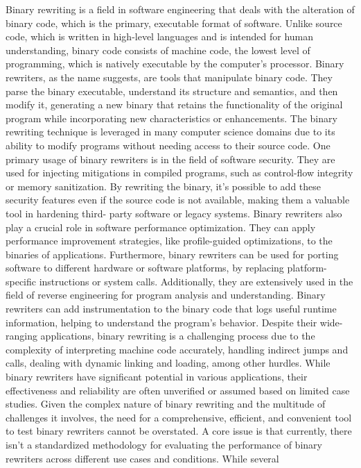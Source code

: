\documentclass[a4paper,11pt,oneside]{report}
\begin{document}
Binary rewriting is a field in software engineering that deals with the alteration of
binary code, which is the primary, executable format of software. Unlike source code, which
is written in high-level languages and is intended for human understanding, binary code
consists of machine code, the lowest level of programming, which is natively executable by
the computer's processor.
Binary rewriters, as the name suggests, are tools that manipulate binary code. They
parse the binary executable, understand its structure and semantics, and then modify it,
generating a new binary that retains the functionality of the original program while
incorporating new characteristics or enhancements. The binary rewriting technique is
leveraged in many computer science domains due to its ability to modify programs without
needing access to their source code.
One primary usage of binary rewriters is in the field of software security. They are
used for injecting mitigations in compiled programs, such as control-flow integrity or
memory sanitization. By rewriting the binary, it's possible to add these security features
even if the source code is not available, making them a valuable tool in hardening third-
party software or legacy systems. Binary rewriters also play a crucial role in software
performance optimization. They can apply performance improvement strategies, like
profile-guided optimizations, to the binaries of applications. Furthermore, binary rewriters
can be used for porting software to different hardware or software platforms, by replacing
platform-specific instructions or system calls. Additionally, they are extensively used in the
field of reverse engineering for program analysis and understanding. Binary rewriters can
add instrumentation to the binary code that logs useful runtime information, helping to
understand the program's behavior.
Despite their wide-ranging applications, binary rewriting is a challenging process due
to the complexity of interpreting machine code accurately, handling indirect jumps and
calls, dealing with dynamic linking and loading, among other hurdles.
While binary rewriters have significant potential in various applications, their
effectiveness and reliability are often unverified or assumed based on limited case studies.
Given the complex nature of binary rewriting and the multitude of challenges it involves, the
need for a comprehensive, efficient, and convenient tool to test binary rewriters cannot be
overstated.
A core issue is that currently, there isn't a standardized methodology for evaluating
the performance of binary rewriters across different use cases and conditions. While several
\end{document}
